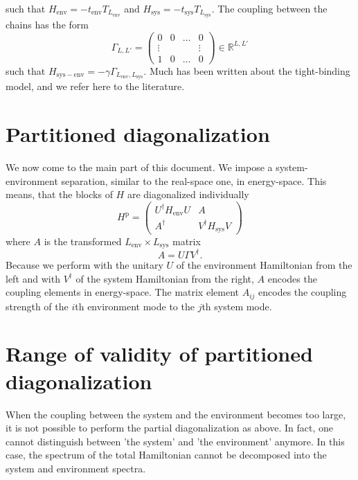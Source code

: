 \documentclass{article}
\begin{document}
such that $H_\mathrm{env} = -t_\mathrm{env}T_{L_\mathrm{env}}$ and $H_\mathrm{sys} = -t_\mathrm{sys}T_{L_\mathrm{sys}}$. The coupling between the chains has the form
\begin{equation}
	\Gamma_{L,L'} = \begin{pmatrix}
		0 & 0 & \dots & 0\\
		\vdots & & & \vdots\\
		1 & 0 & \dots & 0
	\end{pmatrix} \in \mathds{R}^{L,L'}
\end{equation}
such that $H_\mathrm{sys-env} = - \gamma \Gamma_{L_\mathrm{env},L_\mathrm{sys}}$. Much has been written about the tight-binding model, and we refer here to the literature. 
\section{Partitioned diagonalization}
We now come to the main part of this document. We impose a system-environment separation, similar to the real-space one, in energy-space. This means, that the blocks of $H$ are diagonalized individually
\begin{equation}
	H^\mathrm{p} = \begin{pmatrix}
		U^\dagger H_\mathrm{env} U & A\\
		A^\dagger & V^\dagger H_\mathrm{sys} V
	\end{pmatrix}\label{eq:PartitionedDiagonalization}
\end{equation}
where $A$ is the transformed $L_\mathrm{env}\times L_\mathrm{sys}$ matrix
\begin{equation}
	A = U\Gamma V^\dagger.
\end{equation}
Because we perform with the unitary $U$ of the environment Hamiltonian from the left and with $V^\dagger$ of the system Hamiltonian from the right, $A$ encodes the coupling elements in energy-space. The matrix element $A_{ij}$ encodes the coupling strength of the $i$th environment mode to the $j$th system mode. 
\section{Range of validity of partitioned diagonalization}
When the coupling between the system and the environment becomes too large, it is not possible to perform the partial diagonalization as above. In fact, one cannot distinguish between 'the system' and 'the environment' anymore. In this case, the spectrum of the total Hamiltonian cannot be decomposed into the system and environment spectra. 
\end{document}
